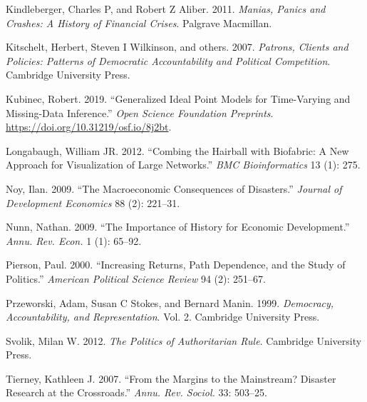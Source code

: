 \documentclass[]{article}
\begin{document}
\leavevmode\hypertarget{ref-kindleberger2011manias}{}%
Kindleberger, Charles P, and Robert Z Aliber. 2011. \emph{Manias, Panics and Crashes: A History of Financial Crises}. Palgrave Macmillan.

\leavevmode\hypertarget{ref-kitschelt2007patrons}{}%
Kitschelt, Herbert, Steven I Wilkinson, and others. 2007. \emph{Patrons, Clients and Policies: Patterns of Democratic Accountability and Political Competition}. Cambridge University Press.

\leavevmode\hypertarget{ref-kubinec2019ideal}{}%
Kubinec, Robert. 2019. ``Generalized Ideal Point Models for Time-Varying and Missing-Data Inference.'' \emph{Open Science Foundation Preprints}. \url{https://doi.org/10.31219/osf.io/8j2bt}.

\leavevmode\hypertarget{ref-longabaugh2012}{}%
Longabaugh, William JR. 2012. ``Combing the Hairball with Biofabric: A New Approach for Visualization of Large Networks.'' \emph{BMC Bioinformatics} 13 (1): 275.

\leavevmode\hypertarget{ref-noy2009macroeconomic}{}%
Noy, Ilan. 2009. ``The Macroeconomic Consequences of Disasters.'' \emph{Journal of Development Economics} 88 (2): 221--31.

\leavevmode\hypertarget{ref-nunn2009importance}{}%
Nunn, Nathan. 2009. ``The Importance of History for Economic Development.'' \emph{Annu. Rev. Econ.} 1 (1): 65--92.

\leavevmode\hypertarget{ref-pierson2000increasing}{}%
Pierson, Paul. 2000. ``Increasing Returns, Path Dependence, and the Study of Politics.'' \emph{American Political Science Review} 94 (2): 251--67.

\leavevmode\hypertarget{ref-przeworski1999democracy}{}%
Przeworski, Adam, Susan C Stokes, and Bernard Manin. 1999. \emph{Democracy, Accountability, and Representation}. Vol. 2. Cambridge University Press.

\leavevmode\hypertarget{ref-svolik2012politics}{}%
Svolik, Milan W. 2012. \emph{The Politics of Authoritarian Rule}. Cambridge University Press.

\leavevmode\hypertarget{ref-tierney2007margins}{}%
Tierney, Kathleen J. 2007. ``From the Margins to the Mainstream? Disaster Research at the Crossroads.'' \emph{Annu. Rev. Sociol.} 33: 503--25.
\end{document}
